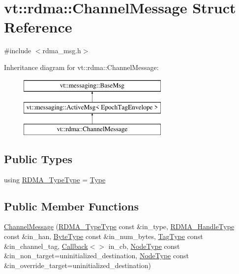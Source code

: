 \hypertarget{structvt_1_1rdma_1_1_channel_message}{}\section{vt\+:\+:rdma\+:\+:Channel\+Message Struct Reference}
\label{structvt_1_1rdma_1_1_channel_message}


{\ttfamily \#include $<$rdma\+\_\+msg.\+h$>$}

Inheritance diagram for vt\+:\+:rdma\+:\+:Channel\+Message\+:\begin{figure}[H]
\begin{center}
\leavevmode
\includegraphics[height=3.000000cm]{structvt_1_1rdma_1_1_channel_message}
\end{center}
\end{figure}
\subsection*{Public Types}
\begin{DoxyCompactItemize}
\item 
using \hyperlink{structvt_1_1rdma_1_1_channel_message_a8cd82de8b91d466fbae2abf28e668c0c}{R\+D\+M\+A\+\_\+\+Type\+Type} = \hyperlink{namespacevt_1_1rdma_ac848e1d9da43db6294bd06f83e5d3946}{Type}
\end{DoxyCompactItemize}
\subsection*{Public Member Functions}
\begin{DoxyCompactItemize}
\item 
\hyperlink{structvt_1_1rdma_1_1_channel_message_ad6ee8a328480b24231dd247397774d49}{Channel\+Message} (\hyperlink{namespacevt_1_1rdma_ac848e1d9da43db6294bd06f83e5d3946}{R\+D\+M\+A\+\_\+\+Type\+Type} const \&in\+\_\+type, \hyperlink{namespacevt_a10442579ec4e7ebef223818e64bcf908}{R\+D\+M\+A\+\_\+\+Handle\+Type} const \&in\+\_\+han, \hyperlink{namespacevt_aab8d55968084610ce3b17057981e9300}{Byte\+Type} const \&in\+\_\+num\+\_\+bytes, \hyperlink{namespacevt_a84ab281dae04a52a4b243d6bf62d0e52}{Tag\+Type} const \&in\+\_\+channel\+\_\+tag, \hyperlink{namespacevt_a57b238783d05de96bc2c4027f7073b7f}{Callback}$<$$>$ in\+\_\+cb, \hyperlink{namespacevt_a866da9d0efc19c0a1ce79e9e492f47e2}{Node\+Type} const \&in\+\_\+non\+\_\+target=uninitialized\+\_\+destination, \hyperlink{namespacevt_a866da9d0efc19c0a1ce79e9e492f47e2}{Node\+Type} const \&in\+\_\+override\+\_\+target=uninitialized\+\_\+destination)
\end{DoxyCompactItemize}
